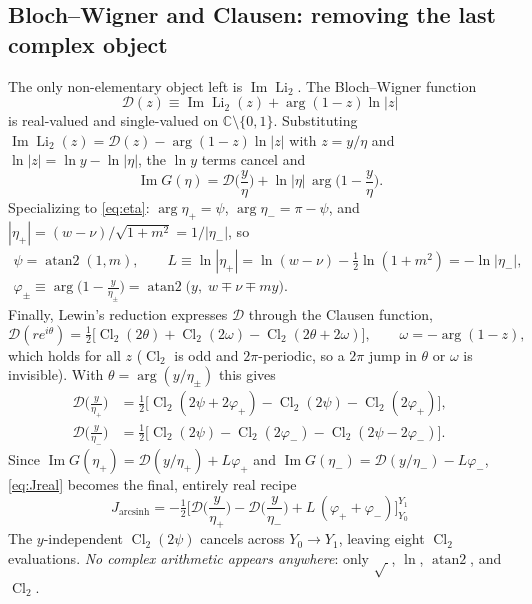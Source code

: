 \documentclass[11pt]{article}
\numberwithin{equation}{section}
\newcommand{\half}{\tfrac{1}{2}}
\DeclareMathOperator{\arcsinh}{arcsinh}
\DeclareMathOperator{\Cl}{Cl}
\DeclareMathOperator{\Li}{Li}
\DeclareMathOperator{\atantwo}{atan2}
\begin{document}
\subsection{Bloch--Wigner and Clausen: removing the last complex object}
The only non-elementary object left is $\operatorname{Im}\Li_2$. The Bloch--Wigner function
\begin{equation}\label{eq:BW}
  \mathcal D(z)\equiv\operatorname{Im}\Li_2(z)+\arg(1-z)\ln|z|
\end{equation}
is real-valued and single-valued on $\mathbb C\setminus\{0,1\}$. Substituting
$\operatorname{Im}\Li_2(z)=\mathcal D(z)-\arg(1-z)\ln|z|$ with $z=y/\eta$ and
$\ln|z|=\ln y-\ln|\eta|$, the $\ln y$ terms cancel and
\begin{equation}\label{eq:ImG}
  \operatorname{Im}G(\eta)=\mathcal D\!\Big(\frac{y}{\eta}\Big)+\ln|\eta|\,\arg\!\Big(1-\frac{y}{\eta}\Big).
\end{equation}
Specializing to \eqref{eq:eta}: $\arg\eta_+=\psi$, $\arg\eta_-=\pi-\psi$, and
$|\eta_+|=(w-\nu)/\sqrt{1+m^2}=1/|\eta_-|$, so
\begin{equation}\label{eq:clparams}
\begin{gathered}
  \psi=\atantwo(1,m),\qquad
  L\equiv\ln|\eta_+|=\ln(w-\nu)-\half\ln(1+m^2)=-\ln|\eta_-| ,\\
  \varphi_\pm\equiv\arg\!\Big(1-\frac{y}{\eta_\pm}\Big)=\atantwo\big(y,\;w\mp\nu\mp my\big).
\end{gathered}
\end{equation}
Finally, Lewin's reduction expresses $\mathcal D$ through the Clausen function,
\begin{equation}\label{eq:lewin}
  \mathcal D(re^{i\theta})=\half\big[\Cl_2(2\theta)+\Cl_2(2\omega)-\Cl_2(2\theta+2\omega)\big],
  \qquad \omega=-\arg(1-z),
\end{equation}
which holds for all $z$ ($\Cl_2$ is odd and $2\pi$-periodic, so a $2\pi$ jump in $\theta$ or $\omega$ is
invisible). With $\theta=\arg(y/\eta_\pm)$ this gives
\begin{equation}\label{eq:Dcl}
\begin{aligned}
  \mathcal D\!\Big(\frac{y}{\eta_+}\Big)&=\half\big[\Cl_2(2\psi+2\varphi_+)-\Cl_2(2\psi)-\Cl_2(2\varphi_+)\big],\\
  \mathcal D\!\Big(\frac{y}{\eta_-}\Big)&=\half\big[\Cl_2(2\psi)-\Cl_2(2\varphi_-)-\Cl_2(2\psi-2\varphi_-)\big].
\end{aligned}
\end{equation}
Since $\operatorname{Im}G(\eta_+)=\mathcal D(y/\eta_+)+L\varphi_+$ and
$\operatorname{Im}G(\eta_-)=\mathcal D(y/\eta_-)-L\varphi_-$, \eqref{eq:Jreal} becomes the final,
entirely real recipe
\begin{equation}\label{eq:Jclausen}
  \boxed{\;J_{\arcsinh}=-\half\Big[\mathcal D\!\Big(\frac{y}{\eta_+}\Big)-\mathcal D\!\Big(\frac{y}{\eta_-}\Big)
  +L\,(\varphi_++\varphi_-)\Big]_{Y_0}^{Y_1}\;}
\end{equation}
The $y$-independent $\Cl_2(2\psi)$ cancels across $Y_0\to Y_1$, leaving eight $\Cl_2$ evaluations.
\emph{No complex arithmetic appears anywhere}: only $\sqrt{\ }$, $\ln$, $\atantwo$, and $\Cl_2$.
\end{document}
